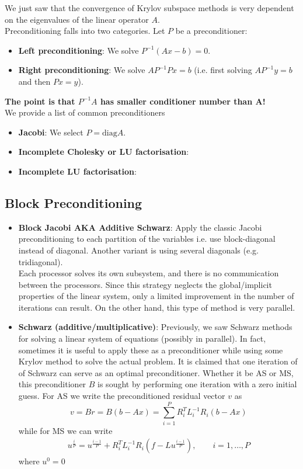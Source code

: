 We just saw that the convergence of Krylov subspace methods is very dependent on the 
eigenvalues of the linear operator $A$.\\

Preconditioning falls into two categories. Let $P$ be a preconditioner:
\begin{itemize}
\item \textbf{Left preconditioning}: We solve $P^{-1}(Ax - b) = 0$.
\item \textbf{Right preconditioning}: We solve $A P^{-1} P x = b$ (i.e. first solving $A P^{-1} y = b$ and then $Px = y$).
\end{itemize}

\textbf{The point is that $P^{-1}A$ has smaller conditioner number than A!}\\

We provide a list of common preconditioners
\begin{itemize}
\item \textbf{Jacobi}: We select $P = \text{diag} A$.
\item \textbf{Incomplete Cholesky or LU factorisation}:
\item \textbf{Incomplete LU factorisation}:
\end{itemize}

\subsection{Block Preconditioning}


\begin{itemize}
\item \textbf{Block Jacobi AKA Additive Schwarz}: Apply the classic Jacobi preconditioning to each partition of the variables i.e. use block-diagonal instead of diagonal.
Another variant is using several diagonals (e.g. tridiagonal).\\
Each processor solves its own subsystem, and there is no communication between the processors. Since this strategy neglects the global/implicit properties of the linear system, only a limited improvement in the number of iterations can result. On the other hand, this type of method is very parallel.
\item \textbf{Schwarz (additive/multiplicative)}: Previously, we saw Schwarz methods for solving a linear system of equations (possibly in parallel). In
fact, sometimes it is useful to apply these as a preconditioner while using some Krylov method to solve the actual problem. It is claimed that one iteration
of of Schwarz can serve as an optimal preconditioner. Whether it be AS or MS, this preconditioner $B$ is sought by performing one iteration with a zero
initial guess. For AS we write the preconditioned residual vector $v$ as
\[
v = Br = B(b-Ax) = \sum_{i=1}^P R^T_i L^{-1}_i R_i (b-Ax)
\]
while for MS we can write
\begin{align*}
u^{\frac{i}{P}} = u^{\frac{i-1}{P}} + R^T_i L^{-1}_i R_i (f - L u^{\frac{i-1}{P}}), \qquad i=1,\dots,P
\end{align*}
where $u^0 = 0$
\end{itemize}

